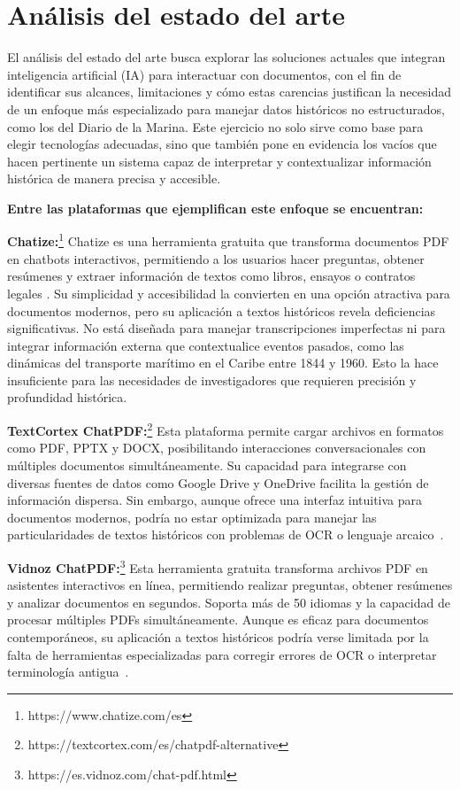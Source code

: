 \section{Análisis del estado del arte}
El análisis del estado del arte busca explorar las soluciones actuales que integran inteligencia artificial (IA) para interactuar con documentos, con el fin de identificar sus alcances, limitaciones y cómo estas carencias justifican la necesidad de un enfoque más especializado para manejar datos históricos no estructurados, como los del Diario de la Marina. Este ejercicio no solo sirve como base para elegir tecnologías adecuadas, sino que también pone en evidencia los vacíos que hacen pertinente un sistema capaz de interpretar y contextualizar información histórica de manera precisa y accesible.

\textbf{Entre las plataformas que ejemplifican este enfoque se encuentran:}

\textbf{Chatize:}\footnote{https://www.chatize.com/es} Chatize es una herramienta gratuita que transforma documentos PDF en chatbots interactivos, permitiendo a los usuarios hacer preguntas, obtener resúmenes y extraer información de textos como libros, ensayos o contratos legales \cite{chatize2023web}. Su simplicidad y accesibilidad la convierten en una opción atractiva para documentos modernos, pero su aplicación a textos históricos revela deficiencias significativas. No está diseñada para manejar transcripciones imperfectas ni para integrar información externa que contextualice eventos pasados, como las dinámicas del transporte marítimo en el Caribe entre 1844 y 1960. Esto la hace insuficiente para las necesidades de investigadores que requieren precisión y profundidad histórica.

\textbf{TextCortex ChatPDF:}\footnote{https://textcortex.com/es/chatpdf-alternative} Esta plataforma permite cargar archivos en formatos como PDF, PPTX y DOCX, posibilitando interacciones conversacionales con múltiples documentos simultáneamente. Su capacidad para integrarse con diversas fuentes de datos como Google Drive y OneDrive facilita la gestión de información dispersa. Sin embargo, aunque ofrece una interfaz intuitiva para documentos modernos, podría no estar optimizada para manejar las particularidades de textos históricos con problemas de OCR o lenguaje arcaico~\cite{textcortex}.

\textbf{Vidnoz ChatPDF:}\footnote{https://es.vidnoz.com/chat-pdf.html} Esta herramienta gratuita transforma archivos PDF en asistentes interactivos en línea, permitiendo realizar preguntas, obtener resúmenes y analizar documentos en segundos. Soporta más de 50 idiomas y la capacidad de procesar múltiples PDFs simultáneamente. Aunque es eficaz para documentos contemporáneos, su aplicación a textos históricos podría verse limitada por la falta de herramientas especializadas para corregir errores de OCR o interpretar terminología antigua~\cite{vidnoz}.

